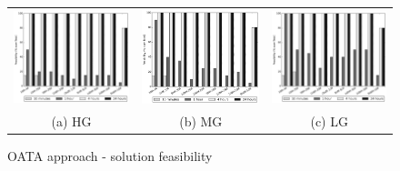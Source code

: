 \begin{figure}
\begin{tabular}{ccc}
\includegraphics[width=.30\linewidth,keepaspectratio]{figs/feasibility_cvs_oarb_high_oat.png} &
\includegraphics[width=.30\linewidth,keepaspectratio]{figs/feasibility_cvs_oarb_medium_oat.png} &
\includegraphics[width=.30\linewidth,keepaspectratio]{figs/feasibility_cvs_oarb_low_oat.png} \\
(a) HG & (b) MG & (c) LG
\end{tabular}
\caption{OATA approach - solution feasibility}
\label{fig:atc_of}
\end{figure}

